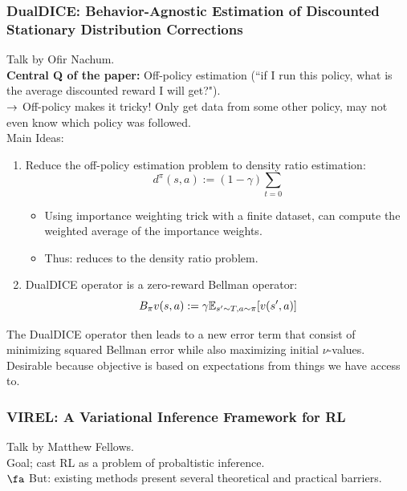 \subsubsection{DualDICE: Behavior-Agnostic Estimation of Discounted Stationary Distribution Corrections \cite{nachum2019dualdice}}

Talk by Ofir Nachum. \\

{\bf Central Q of the paper:} Off-policy estimation (``if I run this policy, what is the average discounted reward I will get?"). \\

$\rightarrow$ Off-policy makes it tricky! Only get data from some other policy, may not even know which policy was followed. \\

Main Ideas:
\begin{enumerate}
    \item Reduce the off-policy estimation problem to density ratio estimation:
    \[
    d^\pi(s,a) := (1-\gamma) \sum_{t=0}
    \]
    \begin{itemize}
        \item Using importance weighting trick with a finite dataset, can compute the weighted average of the importance weights.
        \item Thus: reduces to the density ratio problem.
    \end{itemize}
    \item DualDICE operator is a zero-reward Bellman operator:
    \[
    B_\pi v(s,a) := \gamma \mathbb{E}_{s' \sim T, a \sim \pi}[v(s',a)]
    \]
\end{enumerate}

The DualDICE operator then leads to a new error term that consist of minimizing squared Bellman error while also maximizing initial $\nu$-values. Desirable because objective is based on expectations from things we have access to.

\subsubsection{VIREL: A Variational Inference Framework for RL \cite{fellows2019virel}}

Talk by Matthew Fellows. \\

Goal; cast RL as a problem of probaltistic inference. \\

$\fa$ But: existing methods present several theoretical and practical barriers. \\

